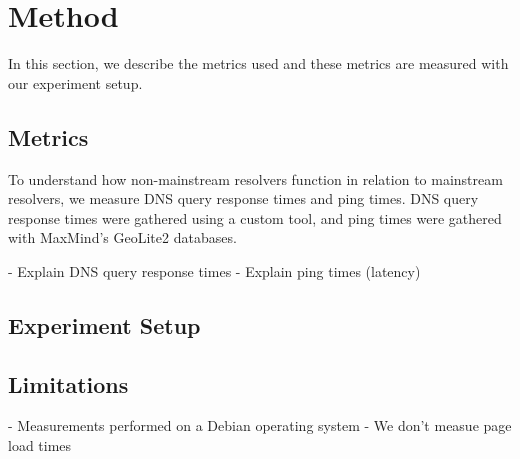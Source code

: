 \section{Method}\label{sec:method}

In this section, we describe the metrics used and these metrics are measured with our experiment setup.

\subsection{Metrics}
To understand how non-mainstream resolvers function in relation to mainstream resolvers, we measure DNS query response times and ping times. 
DNS query response times were gathered using a custom tool, and ping times were gathered with MaxMind's GeoLite2 databases.

- Explain DNS query response times
- Explain ping times (latency)

\subsection{Experiment Setup}

\subsection{Limitations}
	- Measurements performed on a Debian operating system 
	- We don't measue page load times 
	